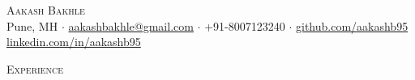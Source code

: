 \documentclass[a4paper]{article}
\newcommand{\lineunder} {
    \vspace*{-8pt} \\
    \hspace*{-18pt} \hrulefill \\
}
\newcommand{\header} [1] {
    {\hspace*{-18pt}\vspace*{6pt} \textsc{#1}}
    \vspace*{-6pt} \lineunder
}
\begin{document}
\vspace*{-40pt}



\vspace*{-10pt}
\begin{center}
    {\Huge \scshape {Aakash Bakhle}}\\
    Pune, MH $\cdot$ \href{mailto:aakashbakhle@gmail.com}{aakashbakhle@gmail.com} $\cdot$ +91-8007123240 $\cdot$ \href{https://github.com/aakashb95}{github.com/aakashb95} \href{http://www.linkedin.com/in/aakashb95}{linkedin.com/in/aakashb95}\\
\end{center}


\header{Experience}
\end{document}
